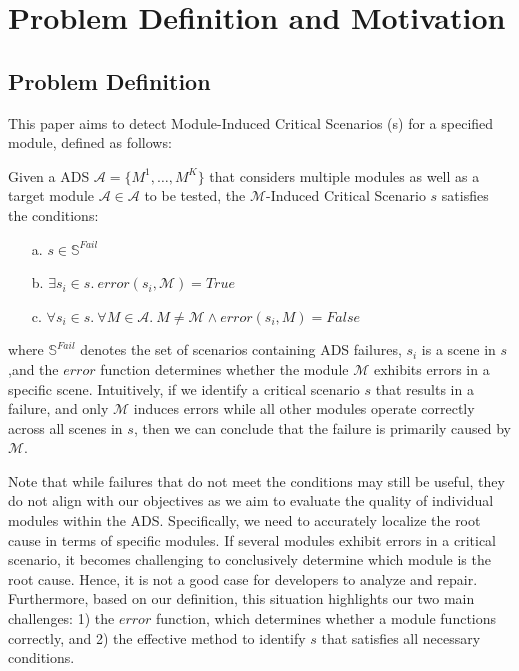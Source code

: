 \section{Problem Definition and Motivation}

\subsection{Problem Definition}\label{def:mccs}
This paper aims to detect Module-Induced Critical Scenarios ({\mccs}s) for a specified module, defined as follows:

\begin{definition}  \label{def-mccs} 
Given a ADS $\mathcal{A} = \{{M}^{1}, \ldots, {M}^{K}\}$ that considers multiple modules as well as a target module $\mathcal{A}\in \mathcal{A}$ to be tested, the $\mathcal{M}$-Induced Critical Scenario $s$ satisfies the conditions: 
\begin{itemize}
    \item[a.] $s \in \mathbb{S}^{Fail}$ %
    \item[b.] $\exists s_i\in s. \ error(s_i, \mathcal{M})=True$
    \item[c.] $\forall s_i \in s. \ \forall M\in \mathcal{A}. \ M\neq \mathcal{M} \wedge error(s_i, M)=False$
\end{itemize}
where $\mathbb{S}^{Fail}$ denotes the set of scenarios containing ADS failures, $s_{i}$ is a scene in $s$ ,and the $error$ function determines whether the module $\mathcal{M}$ exhibits errors in a specific scene. Intuitively, if we identify a critical scenario $s$ that results in a failure, and only $\mathcal{M}$ induces errors while all other modules operate correctly across all scenes in $s$, then we can conclude that the failure is primarily caused by $\mathcal{M}$.
\end{definition}

Note that while failures that do not meet the \mccs conditions may still be useful, they do not align with our objectives as we aim to evaluate the quality of individual modules within the ADS. Specifically, we need to accurately localize the root cause in terms of specific modules. If several modules exhibit errors in a critical scenario, it becomes challenging to conclusively determine which module is the root cause. Hence, it is not a good case for developers to analyze and repair. Furthermore, based on our definition, this situation highlights our two main challenges: 1) the $error$ function, which determines whether a module functions correctly, and 2) the effective method to identify \mccs $s$ that satisfies all necessary conditions.





